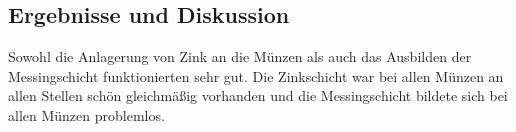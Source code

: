 \documentclass{article}
\begin{document}
    \subsection{Ergebnisse und Diskussion}
      
      Sowohl die Anlagerung von Zink an die Münzen als auch das Ausbilden der Messingschicht funktionierten sehr gut. Die Zinkschicht war bei allen Münzen an allen Stellen schön gleichmäßig vorhanden und die Messingschicht bildete sich bei allen Münzen problemlos.
    
  \pagebreak
  
  \listofreactions
  \printbibliography[title=Literaturverzeichnis]
  \listoffigures
  \listoftables
  
\end{document}
